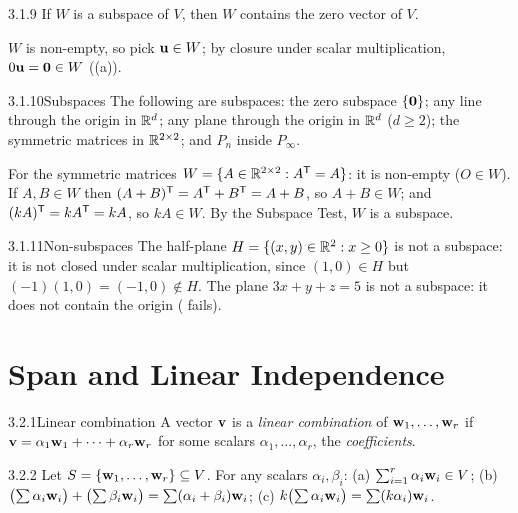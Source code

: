 \begin{thms}{3.1.9}{}
If $W$ is a subspace of $V$, then $W$ contains the zero vector of $V$.
\end{thms}

\begin{prf}
$W$ is non-empty, so pick $\mathbf{u}\in W$; by closure under scalar multiplication, $0\mathbf{u}=\mathbf{0}\in W$ ((a)).
\end{prf}

\begin{exmp}{3.1.10}{Subspaces}
The following are subspaces: the zero subspace $\{\mathbf{0}\}$; any line through the origin in $\mathbb{R}^d$; any plane through the origin in $\mathbb{R}^d$ ($d\ge2$); the symmetric matrices in $\mathbb{R}^{2\times2}$; and $P_n$ inside $P_\infty$.

\smallskip
For the symmetric matrices $W=\{A\in\mathbb{R}^{2\times2}:A^{\mathsf{T}}=A\}$: it is non-empty ($O\in W$). If $A,B\in W$ then $(A+B)^{\mathsf{T}}=A^{\mathsf{T}}+B^{\mathsf{T}}=A+B$, so $A+B\in W$; and $(kA)^{\mathsf{T}}=kA^{\mathsf{T}}=kA$, so $kA\in W$. By the Subspace Test, $W$ is a subspace.
\end{exmp}

\begin{exmp}{3.1.11}{Non-subspaces}
The half-plane $H=\{(x,y)\in\mathbb{R}^2:x\ge0\}$ is not a subspace: it is not closed under scalar multiplication, since $(1,0)\in H$ but $(-1)(1,0)=(-1,0)\notin H$. The plane $3x+y+z=5$ is not a subspace: it does not contain the origin ( fails).
\end{exmp}

\section{Span and Linear Independence}
\label{sec:3.2}

\begin{defns}{3.2.1}{Linear combination}
A vector $\mathbf{v}$ is a \emph{linear combination} of $\mathbf{w}_1,\dots,\mathbf{w}_r$ if $\mathbf{v}=\alpha_1\mathbf{w}_1+\cdots+\alpha_r\mathbf{w}_r$ for some scalars $\alpha_1,\dots,\alpha_r$, the \emph{coefficients}.
\end{defns}

\begin{thms}{3.2.2}{}
Let $S=\{\mathbf{w}_1,\dots,\mathbf{w}_r\}\subseteq V$. For any scalars $\alpha_i,\beta_i$:
\textup{(a)} $\sum_{i=1}^r\alpha_i\mathbf{w}_i\in V$;
\textup{(b)} $\bigl(\sum\alpha_i\mathbf{w}_i\bigr)+\bigl(\sum\beta_i\mathbf{w}_i\bigr)=\sum(\alpha_i+\beta_i)\mathbf{w}_i$;
\textup{(c)} $k\bigl(\sum\alpha_i\mathbf{w}_i\bigr)=\sum(k\alpha_i)\mathbf{w}_i$.
\end{thms}

